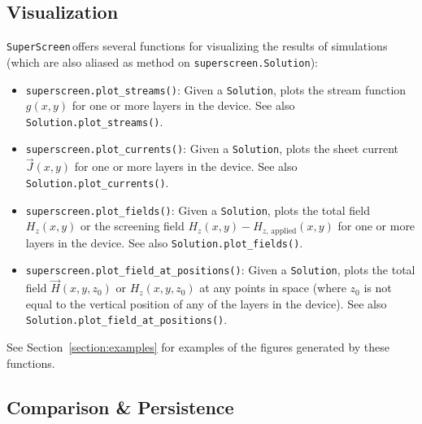 \documentclass{article}
\newcommand{\SuperScreen}{\texttt{SuperScreen}\,}
\begin{document}
\subsection{Visualization}
\label{section:overview:visualization}

\SuperScreen offers several functions for visualizing the results of simulations (which are also aliased as method on \texttt{superscreen.Solution}):

\begin{itemize}
    \item{
    \texttt{superscreen.plot_streams()}: Given a \texttt{Solution}, plots the stream function $g(x, y)$ for one or more layers in the device. See also \texttt{Solution.plot_streams()}.
    }
    \item{
    \texttt{superscreen.plot_currents()}: Given a \texttt{Solution}, plots the sheet current $\vec{J}(x, y)$ for one or more layers in the device. See also \texttt{Solution.plot_currents()}.
    }
    \item{
    \texttt{superscreen.plot_fields()}: Given a \texttt{Solution}, plots the total field $H_z(x, y)$ or the screening field $H_z(x, y) - H_{z,\,\mathrm{applied}}(x, y)$ for one or more layers in the device. See also \texttt{Solution.plot_fields()}.
    }
    \item{
    \texttt{superscreen.plot_field_at_positions()}: Given a \texttt{Solution}, plots the total field $\vec{H}(x, y, z_0)$ or $H_z(x, y, z_0)$ at any points in space (where $z_0$ is not equal to the vertical position of any of the layers in the device). See also \texttt{Solution.plot_field_at_positions()}.
    }
\end{itemize}

See Section~\ref{section:examples} for examples of the figures generated by these functions.

\subsection{Comparison \& Persistence}
\label{section:overview:persistence}
\end{document}
